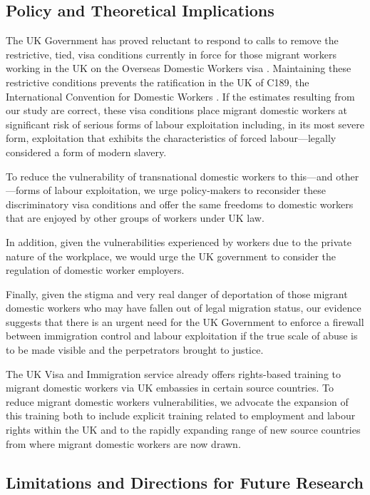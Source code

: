 \documentclass[
  12pt,
  letterpaper,
  DIV=11,
  numbers=noendperiod]{scrartcl}
\theoremstyle{plain}
\theoremstyle{definition}
\begin{document}
\subsection{Policy and Theoretical
Implications}\label{policy-and-theoretical-implications}

The UK Government has proved reluctant to respond to calls to remove the
restrictive, tied, visa conditions currently in force for those migrant
workers working in the UK on the Overseas Domestic Workers visa
\autocite{gower_calls_2016}. Maintaining these restrictive conditions
prevents the ratification in the UK of C189, the International
Convention for Domestic Workers \autocite{ILO11-indicators}. If the
estimates resulting from our study are correct, these visa conditions
place migrant domestic workers at significant risk of serious forms of
labour exploitation including, in its most severe form, exploitation
that exhibits the characteristics of forced labour---legally considered
a form of modern slavery.

To reduce the vulnerability of transnational domestic workers to
this---and other---forms of labour exploitation, we urge policy-makers
to reconsider these discriminatory visa conditions and offer the same
freedoms to domestic workers that are enjoyed by other groups of workers
under UK law.

In addition, given the vulnerabilities experienced by workers due to the
private nature of the workplace, we would urge the UK government to
consider the regulation of domestic worker employers.

Finally, given the stigma and very real danger of deportation of those
migrant domestic workers who may have fallen out of legal migration
status, our evidence suggests that there is an urgent need for the UK
Government to enforce a firewall between immigration control and labour
exploitation if the true scale of abuse is to be made visible and the
perpetrators brought to justice.

The UK Visa and Immigration service already offers rights-based training
to migrant domestic workers via UK embassies in certain source
countries. To reduce migrant domestic workers vulnerabilities, we
advocate the expansion of this training both to include explicit
training related to employment and labour rights within the UK and to
the rapidly expanding range of new source countries from where migrant
domestic workers are now drawn.

\subsection{Limitations and Directions for Future
Research}\label{limitations-and-directions-for-future-research}
\end{document}
